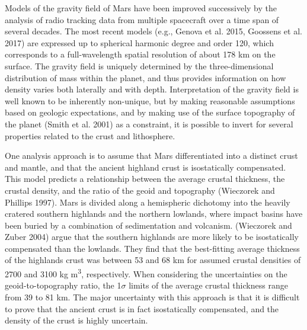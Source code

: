 Models of the gravity field of Mars have been improved successively by the analysis of radio tracking data from multiple spacecraft over a time span of several decades. The most recent models (e.g., Genova et al. 2015, Goossens et al. 2017) are expressed up to spherical harmonic degree and order 120, which corresponds to a full-wavelength spatial resolution of about 178 km on the surface. The gravity field is uniquely determined by the three-dimensional distribution of mass within the planet, and thus provides information on how density varies both laterally and with depth. Interpretation of the gravity field is well known to be inherently non-unique, but by making reasonable assumptions based on geologic expectations, and by making use of the surface topography of the planet  (Smith et al. 2001) as a constraint, it is possible to invert for several properties related to the crust and lithosphere.\par
One analysis approach is to assume that Mars differentiated into a distinct crust and mantle, and that the ancient highland crust is isostatically compensated. This model predicts a relationship between the average crustal thickness, the crustal density, and the ratio of the geoid and topography (Wieczorek and Phillips 1997). Mars is divided along a hemispheric dichotomy into the heavily cratered southern highlands and the northern lowlands, where impact basins have been buried by a combination of sedimentation and volcanism. (Wieczorek and Zuber 2004) argue that the southern highlands are more likely to be isostatically compensated than the lowlands. They find that the best-fitting average thickness of the highlands crust was between 53 and 68 km for assumed crustal densities of 2700 and 3100 kg m\textsuperscript{3}, respectively. When considering the uncertainties on the geoid-to-topography ratio, the 1$\sigma$  limits of the average crustal thickness range from 39 to 81 km. The major uncertainty with this approach is that it is difficult to prove that the ancient crust is in fact isostatically compensated, and the density of the crust is highly uncertain.\par


